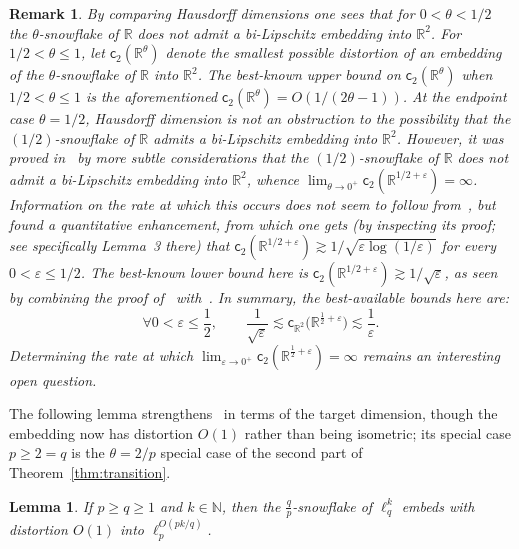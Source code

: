 \documentclass[11pt,reqno]{amsart}
\newtheorem{lemma}[theorem]{Lemma}
\newtheorem{remark}[theorem]{Remark}
\newcommand{\R}{\mathbb{R}}
\newcommand{\N}{\mathbb{N}}
\renewcommand{\le}{\leqslant}
\renewcommand{\ge}{\geqslant}
\newcommand{\cc}{\mathsf{c}}
\newcommand{\e}{\varepsilon}
\newcommand{\1}{\mathbf{1}}
\begin{document}
\begin{remark}\label{rem:theta distortion}{\em By comparing Hausdorff dimensions one sees that for $0<\theta<1/2$ the $\theta$-snowflake of $\R$ does not admit a bi-Lipschitz embedding into $\R^2$. For $1/2<\theta\le 1$, let $\cc_2(\R^\theta)$ denote the smallest possible distortion of an embedding of the $\theta$-snowflake of $\R$ into $\R^2$. The best-known upper bound on $\cc_2(\R^\theta)$ when $1/2<\theta\le 1$ is the  aforementioned $\cc_2(\R^\theta)=O(1/(2\theta-1))$. At the endpoint case $\theta=1/2$, Hausdorff dimension is not an obstruction to the possibility that the $(1/2)$-snowflake of $\R$ admits a bi-Lipschitz embedding into $\R^2$. However,  it was proved in~\cite{BS61} by  more subtle  considerations that the   $(1/2)$-snowflake of $\R$ does not admit a bi-Lipschitz embedding into $\R^2$, whence $\lim_{\theta\to 0^+}  \cc_2(\R^{1/2+\e})=\infty$. Information on the rate at which this occurs does not seem to follow from~\cite{BS61}, but~\cite{Bro67} found a quantitative enhancement, from which one gets (by inspecting its proof; see specifically Lemma~3 there) that $\cc_2(\R^{1/2+\e})\gtrsim 1/\sqrt{\e\log(1/\e)}$ for every $0<\e\le 1/2$. The  best-known lower bound here is $\cc_2(\R^{1/2+\e})\gtrsim 1/\sqrt{\e}$, as seen  by combining the proof of~\cite[Theorem~4.1]{Vai81}  with~\cite[Theorem~2.1]{KP97}. In summary,  the best-available bounds here are: 
\begin{equation}\label{snowflake distortion}
\forall 0<\e\le \frac12,\qquad \frac{1}{\sqrt{\e}}\lesssim \cc_{\R^2}\big(\R^{\frac12+\e}\big)\lesssim \frac{1}{\e}.
\end{equation}
Determining the rate at which $\lim_{\e\to 0^+}\cc_2(\R^{\frac12+\e})=\infty$ remains  an interesting open question.}
\end{remark}


The following lemma strengthens~\cite[Remark~5.10]{MN04} in terms of the target dimension, though the embedding now has distortion $O(1)$ rather than being isometric; its special case $p\ge 2=q$ is  the   $\theta=2/p$ special case of the second part of Theorem~\ref{thm:transition}. 


\begin{lemma}\label{lem:dimesnion version of MN} If $p\ge q\ge 1$ and $k\in \N$, then the $\frac{q}{p}$-snowflake of $\ell_q^k$ embeds with distortion $O(1)$ into $\ell_p^{O(pk/q)}$.
\end{lemma}
\end{document}
